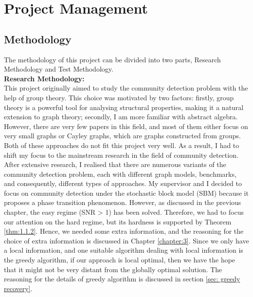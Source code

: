 \chapter{Project Management}\label{chapter 7}

\section{Methodology}
The methodology of this project can be divided into two parts, Research Methodology and Test Methodology.\\

\textbf{Research Methodology:}\\
This project originally aimed to study the community detection problem with the help of group theory. This choice was motivated by two factors: firstly, group theory is a powerful tool for analysing structural properties, making it a natural extension to graph theory; secondly, I am more familiar with abstract algebra. However, there are very few papers in this field, and most of them either focus on very small graphs or Cayley graphs, which are graphs constructed from groups. Both of these approaches do not fit this project very well. As a result, I had to shift my focus to the mainstream research in the field of community detection. After extensive research, I realised that there are numerous variants of the community detection problem, each with different graph models, benchmarks, and consequently, different types of approaches. My supervisor and I decided to focus on community detection under the stochastic block model (SBM) because it proposes a phase transition phenomenon. However, as discussed in the previous chapter, the easy regime (SNR > 1) has been solved. Therefore, we had to focus our attention on the hard regime, but its hardness is supported by Theorem \ref{thm:1.1.2}. Hence, we needed some extra information, and the reasoning for the choice of extra information is discussed in Chapter \ref{chapter:3}. Since we only have a local information, and one suitable algorithm dealing with local information is the greedy algorithm, if our approach is local optimal, then we have the hope that it might not be very distant from the globally optimal solution. The reasoning for the details of greedy algorithm is discussed in section \ref{sec: greedy recovery}.\\

